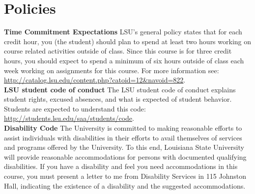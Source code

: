 \documentclass[11pt,article,oneside]{memoir}
\begin{document}
\printbibliography[title={\normalsize{Architecture}},keyword=architecture, heading=subbibliography]

\printbibliography[title={\normalsize{Landscape}},keyword=landscape, heading=subbibliography]

\printbibliography[title={\normalsize{Culture}},keyword=culture, heading=subbibliography]

\printbibliography[title={\normalsize{Computing}},keyword=software, heading=subbibliography]

\printbibliography[title={\normalsize{Conservation}},keyword=conservation, heading=subbibliography]

\clearpage
\section{Policies}

\noindent \textbf{Time Commitment Expectations}
LSU's general policy states that for each credit hour, you (the student) should plan to
spend at least two hours working on course related activities outside of class. Since this course is for three credit hours, you should expect to spend a minimum of six hours outside of class each week working on assignments for this course. For more information see: 
\url{http://catalog.lsu.edu/content.php?catoid=12&navoid=822}.\\

\noindent \textbf{LSU student code of conduct}
The LSU student code of conduct explains student rights, excused absences, and what is expected of student behavior. Students are expected to understand this code:  \url{http://students.lsu.edu/saa/students/code}.\\ %

\noindent \textbf{Disability Code}
The University is committed to making reasonable efforts to assist individuals with disabilities in
their efforts to avail themselves of services and programs offered by the University. To this end,
Louisiana State University will provide reasonable accommodations for persons with
documented qualifying disabilities. If you have a disability and feel you need accommodations in
this course, you must present a letter to me from Disability Services in 115 Johnston Hall,
indicating the existence of a disability and the suggested accommodations.\\
\end{document}
